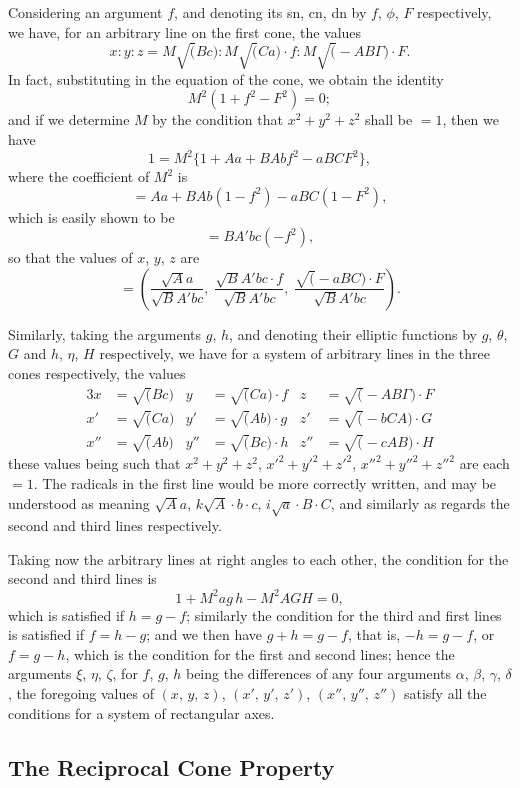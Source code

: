 \documentclass[11pt,a4paper]{article}
\theoremstyle{cayley}
\begin{document}
Considering an argument $f$, and denoting its sn, cn, dn by $f$, $\phi$, $F$ respectively, we have, for an arbitrary line on the first cone, the values
\[
x : y : z = M\surd(Bc) : M\surd(Ca)\cdot f : M\surd(-AB\Gamma)\cdot F.
\]
In fact, substituting in the equation of the cone, we obtain the identity
\[
M^{2}(1 + f^{2} - F^{2}) = 0;
\]
and if we determine $M$ by the condition that $x^{2} + y^{2} + z^{2}$ shall be $=1$, then we have
\[
1 = M^{2}\{1 + Aa + BAbf^{2} - aBCF^{2}\},
\]
where the coefficient of $M^{2}$ is
\[
= Aa + BAb(1 - f^{2}) - aBC(1 - F^{2}),
\]
which is easily shown to be
\[
= BA'bc(-f^{2}),
\]
so that the values of $x$, $y$, $z$ are
\[
= \left(\frac{\surd Aa}{\surd BA'bc},\; \frac{\surd BA'bc\cdot f}{\surd BA'bc},\; \frac{\surd(-aBC)\cdot F}{\surd BA'bc}\right).
\]

Similarly, taking the arguments $g$, $h$, and denoting their elliptic functions by $g$, $\theta$, $G$ and $h$, $\eta$, $H$ respectively, we have for a system of arbitrary lines in the three cones respectively, the values
\begin{alignat*}{3}
x &= \surd(Bc) & y &= \surd(Ca)\cdot f & z &= \surd(-AB\Gamma)\cdot F \\
x' &= \surd(Ca) & y' &= \surd(Ab)\cdot g & z' &= \surd(-bCA)\cdot G \\
x'' &= \surd(Ab) & y'' &= \surd(Bc)\cdot h & z'' &= \surd(-cAB)\cdot H
\end{alignat*}
these values being such that $x^{2}+y^{2}+z^{2}$, $x'^{2}+y'^{2}+z'^{2}$, $x''^{2}+y''^{2}+z''^{2}$ are each $=1$. The radicals in the first line would be more correctly written, and may be understood as meaning $\surd Aa$, $k\surd A\cdot b\cdot c$, $i\surd a\cdot B\cdot C$, and similarly as regards the second and third lines respectively.

Taking now the arbitrary lines at right angles to each other, the condition for the second and third lines is
\[
1 + M^{2}ag\,h - M^{2}AGH = 0,
\]
which is satisfied if $h = g - f$; similarly the condition for the third and first lines is satisfied if $f = h - g$; and we then have $g + h = g - f$, that is, $-h = g - f$, or $f = g - h$, which is the condition for the first and second lines; hence the arguments $\xi$, $\eta$, $\zeta$, for $f$, $g$, $h$ being the differences of any four arguments $\alpha$, $\beta$, $\gamma$, $\delta$, the foregoing values of $(x,\, y,\, z)$, $(x',\, y',\, z')$, $(x'',\, y'',\, z'')$ satisfy all the conditions for a system of rectangular axes.

\subsection*{The Reciprocal Cone Property}
\end{document}
